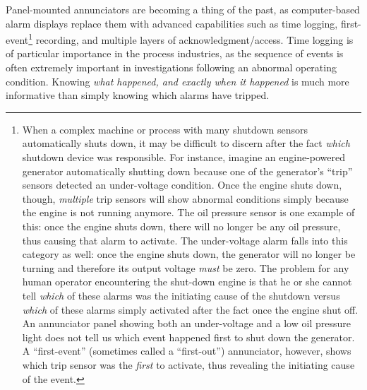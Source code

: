 Panel-mounted annunciators are becoming a thing of the past, as computer-based alarm displays replace them with advanced capabilities such as time logging, first-event\footnote{When a complex machine or process with many shutdown sensors automatically shuts down, it may be difficult to discern after the fact \textit{which} shutdown device was responsible.  For instance, imagine an engine-powered generator automatically shutting down because one of the generator's ``trip'' sensors detected an under-voltage condition.  Once the engine shuts down, though, \textit{multiple} trip sensors will show abnormal conditions simply because the engine is not running anymore.  The oil pressure sensor is one example of this: once the engine shuts down, there will no longer be any oil pressure, thus causing that alarm to activate.  The under-voltage alarm falls into this category as well: once the engine shuts down, the generator will no longer be turning and therefore its output voltage \textit{must} be zero.  The problem for any human operator encountering the shut-down engine is that he or she cannot tell \textit{which} of these alarms was the initiating cause of the shutdown versus \textit{which} of these alarms simply activated after the fact once the engine shut off.  An annunciator panel showing both an under-voltage and a low oil pressure light does not tell us which event happened first to shut down the generator.  A ``first-event'' (sometimes called a ``first-out'') annunciator, however, shows which trip sensor was the \textit{first} to activate, thus revealing the initiating cause of the event.} recording, and multiple layers of acknowledgment/access.  Time logging is of particular importance in the process industries, as the sequence of events is often extremely important in investigations following an abnormal operating condition.  Knowing \textit{what happened, and exactly when it happened} is much more informative than simply knowing which alarms have tripped.















